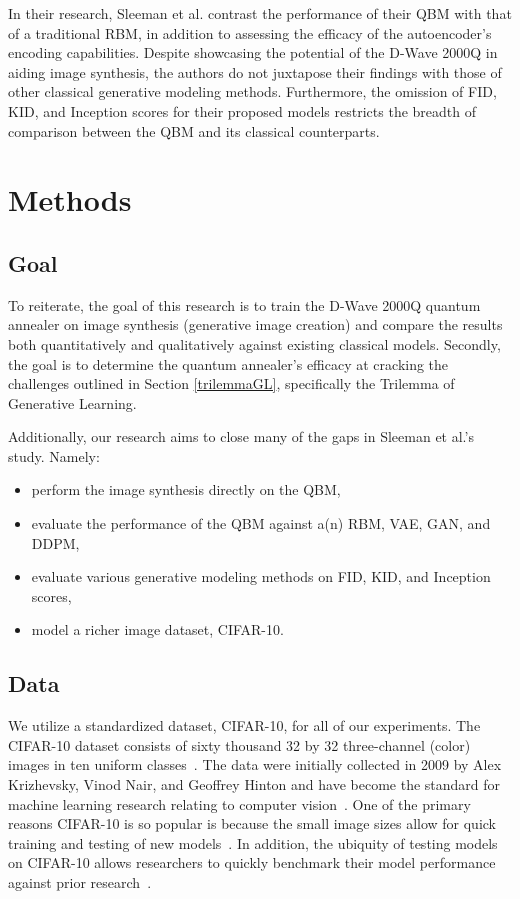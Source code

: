 \documentclass[technologies,article,accept,pdftex,moreauthors]{Definitions/mdpi}
\begin{document}
In their research, Sleeman et al. contrast the performance of their QBM with that of a traditional RBM, in addition to assessing the efficacy of the autoencoder's encoding capabilities. Despite showcasing the potential of the D-Wave 2000Q in aiding image synthesis, the authors do not juxtapose their findings with those of other classical generative modeling methods. Furthermore, the omission of FID, KID, and Inception scores for their proposed models restricts the breadth of comparison between the QBM and its classical counterparts.

\section{Methods}
\subsection{Goal}
To reiterate, the goal of this research is to train the D-Wave 2000Q quantum annealer on image synthesis (generative image creation) and compare the results both quantitatively and qualitatively against existing classical models. Secondly, the goal is to determine the quantum annealer's efficacy at cracking the challenges outlined in Section \ref{trilemmaGL}, specifically the Trilemma of Generative Learning. 



Additionally, our research aims to close many of the gaps in Sleeman et al.'s study. Namely:

\begin{itemize}
    \item perform the image synthesis directly on the QBM,
    \item evaluate the performance of the QBM against a(n) RBM, VAE, GAN, and DDPM,
    \item evaluate various generative modeling methods on FID, KID, and Inception scores,
    \item model a richer image dataset, CIFAR-10.
\end{itemize}

\subsection{Data}
We utilize a standardized dataset, CIFAR-10, for all of our experiments. The CIFAR-10 dataset consists of sixty thousand 32 by 32 three-channel (color) images in ten uniform classes~\cite{CIFAR}. The data were initially collected in 2009 by Alex Krizhevsky, Vinod Nair, and Geoffrey Hinton and have become the standard for machine learning research relating to computer vision~\cite{Krizhevsky09learningmultiple}. One of the primary reasons CIFAR-10 is so popular is because the small image sizes allow for quick training and testing of new models~\cite{ai_progress_measurement}. In addition, the ubiquity of testing models on CIFAR-10 allows researchers to quickly benchmark their model performance against prior research~\cite{ai_progress_measurement}.
\end{document}
